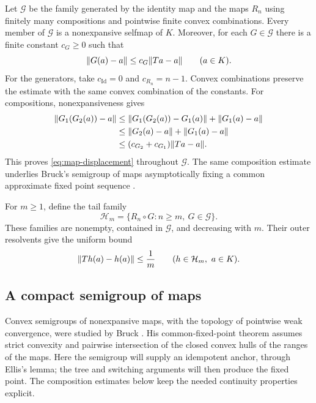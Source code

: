 Let $\mathcal G$ be the family generated by the identity map and the
maps $R_n$ using finitely many compositions and pointwise finite convex
combinations.  Every member of $\mathcal G$ is a nonexpansive selfmap of
$K$.  Moreover, for each $G\in\mathcal G$ there is a finite constant
$c_G\geq0$ such that
\begin{equation}
\label{eq:map-displacement}
 \lVert G(a)-a\rVert\leq c_G\lVert Ta-a\rVert
 \qquad(a\in K).
\end{equation}
For the generators, take $c_{\mathrm{Id}}=0$ and $c_{R_n}=n-1$.
Convex combinations preserve the estimate with the same convex
combination of the constants.  For compositions, nonexpansiveness gives
\begin{align*}
 \lVert G_1(G_2(a))-a\rVert
 &\leq\lVert G_1(G_2(a))-G_1(a)\rVert+\lVert G_1(a)-a\rVert\\
 &\leq\lVert G_2(a)-a\rVert+\lVert G_1(a)-a\rVert\\
 &\leq(c_{G_2}+c_{G_1})\lVert Ta-a\rVert.
\end{align*}
This proves \eqref{eq:map-displacement} throughout $\mathcal G$.
The same composition estimate underlies Bruck's semigroup of maps
asymptotically fixing a common approximate fixed point sequence
\cite[p.~115]{Bruck1975}.

For $m\geq1$, define the tail family
\begin{equation}
\label{eq:tail-family}
 \mathcal H_m
   =\{R_n\circ G:n\geq m,\ G\in\mathcal G\}.
\end{equation}
These families are nonempty, contained in $\mathcal G$, and decreasing
with $m$.  Their outer resolvents give the uniform bound
\begin{equation}
\label{eq:tail-defect}
 \lVert T h(a)-h(a)\rVert\leq\frac1m
 \qquad(h\in\mathcal H_m,\ a\in K).
\end{equation}

\subsection{A compact semigroup of maps}


Convex semigroups of nonexpansive maps, with the topology of pointwise
weak convergence, were studied by Bruck \cite{Bruck1975}. His
common-fixed-point theorem assumes strict convexity and pairwise
intersection of the closed convex hulls of the ranges of the maps.
Here the semigroup will supply an idempotent anchor, through Ellis's
lemma; the tree and switching arguments will then produce the fixed
point. The composition estimates below keep the needed continuity
properties explicit.


